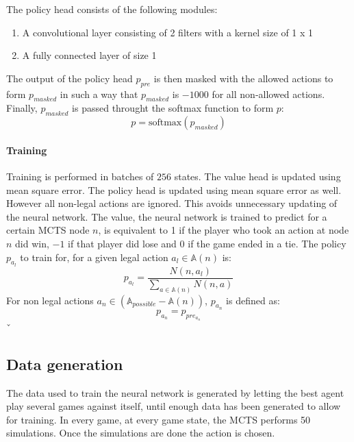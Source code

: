 \documentclass[12pt]{article}
\begin{document}
The policy head consists of the following modules:
\begin{enumerate}
\item A convolutional layer consisting of 2 filters with a kernel size of 1 x 1
\item A fully connected layer of size 1
\end{enumerate}
The output of the policy head \(p_{pre}\) is then masked with the allowed actions to form \(p_{masked}\) in such a way that \(p_{masked}\) is \(-1000\) for all non-allowed actions. Finally, \(p_{masked}\) is passed throught the softmax function to form \(p\):
\begin{equation}\label{eq:nn:policyDefinition}
p = \text{softmax}(p_{masked})
\end{equation}

\paragraph{Training}\label{sec:Methods:NN:A0:Training}
Training is performed in batches of \(256\) states. The value head is updated using mean square error. The policy head is updated using mean square error as well. However all non-legal actions are ignored. This avoids unnecessary updating of the neural network. The value, the neural network is trained to predict for a certain MCTS node \(n\), is equivalent to 1 if the player who took an action at node \(n\) did win, \(-1\) if that player did lose and \(0\) if the game ended in a tie. The policy \(p_{a_l}\) to train for, for a given legal action \(a_l \in \mathbb A(n)\) is:
\begin{equation} \label{eq:NN:policy_computation}
p_{a_l} = \frac{N(n, a_l)}{\sum_{a\in \mathbb A(n)} N(n, a)}
\end{equation}
For non legal actions \(a_n \in (\mathbb A_{possible} - \mathbb A(n))\), \(p_{a_n}\) is defined as:
\begin{equation} \label{eq:NN:policy_computation_nonlegal}
p_{a_n} = p_{pre_{a_n}}
\end{equation}ˇ


\subsection{Data generation}
The data used to train the neural network is generated by letting the best agent play several games against itself, until enough data has been generated to allow for training. In every game, at every game state, the MCTS performs 50 simulations. Once the simulations are done the action is chosen.
\end{document}
